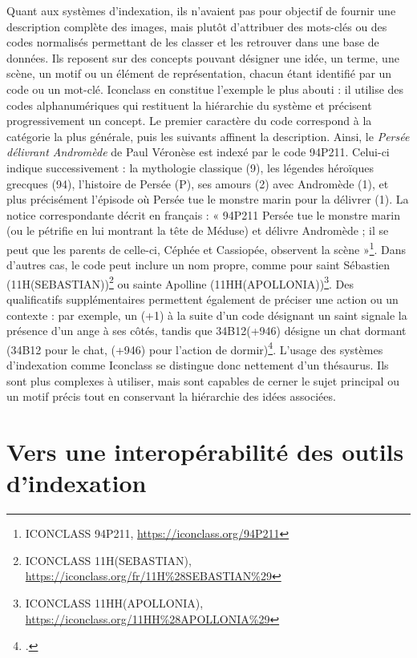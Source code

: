 Quant aux systèmes d’indexation, ils n’avaient pas pour objectif de fournir une description complète des images, mais plutôt d’attribuer des mots-clés ou des codes normalisés permettant de les classer et les retrouver dans une base de données. Ils reposent sur des concepts pouvant désigner une idée, un terme, une scène, un motif ou un élément de représentation, chacun étant identifié par un code ou un mot-clé. Iconclass en constitue l’exemple le plus abouti : il utilise des codes alphanumériques qui restituent la hiérarchie du système et précisent progressivement un concept. Le premier caractère du code correspond à la catégorie la plus générale, puis les suivants affinent la description. Ainsi, le \textit{Persée délivrant Andromède} de Paul Véronèse est indexé par le code 94P211. Celui-ci indique successivement : la mythologie classique (9), les légendes héroïques grecques (94), l’histoire de Persée (P), ses amours (2) avec Andromède (1), et plus précisément l’épisode où Persée tue le monstre marin pour la délivrer (1). La notice correspondante décrit en français : « 94P211 Persée tue le monstre marin (ou le pétrifie en lui montrant la tête de Méduse) et délivre Andromède ; il se peut que les parents de celle-ci, Céphée et Cassiopée, observent la scène »\footnote{ICONCLASS 94P211, \url{https://iconclass.org/94P211}}. Dans d’autres cas, le code peut inclure un nom propre, comme pour saint Sébastien (11H(SEBASTIAN))\footnote{ICONCLASS 11H(SEBASTIAN),  \url{https://iconclass.org/fr/11H\%28SEBASTIAN\%29}} ou sainte Apolline (11HH(APOLLONIA))\footnote{ICONCLASS 11HH(APOLLONIA), \url{https://iconclass.org/11HH\%28APOLLONIA\%29}}. Des qualificatifs supplémentaires permettent également de préciser une action ou un contexte : par exemple, un (+1) à la suite d’un code désignant un saint signale la présence d’un ange à ses côtés, tandis que 34B12(+946) désigne un chat dormant (34B12 pour le chat, (+946) pour l’action de dormir)\footcite[p. 59]{vanstratenIconographyIndexingIconclass1994}. L’usage des systèmes d’indexation comme Iconclass se distingue donc nettement d’un thésaurus. Ils sont plus complexes à utiliser, mais sont capables de cerner le sujet principal ou un motif précis tout en conservant la hiérarchie des idées associées.

\section{Vers une interopérabilité des outils d’indexation}

